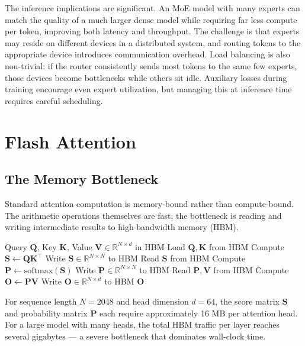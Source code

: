 \documentclass{book}
\begin{document}
The inference implications are significant. An MoE model with many experts
can match the quality of a much larger dense model while requiring far less
compute per token, improving both latency and throughput. The challenge is
that experts may reside on different devices in a distributed system, and
routing tokens to the appropriate device introduces communication overhead.
Load balancing is also non-trivial: if the router consistently sends most
tokens to the same few experts, those devices become bottlenecks while
others sit idle. Auxiliary losses during training encourage even expert
utilization, but managing this at inference time requires careful scheduling.

\section{Flash Attention}
\label{sec:flash_attention}

\subsection{The Memory Bottleneck}
\label{sec:attention_bottleneck}

Standard attention computation is memory-bound rather than compute-bound.
The arithmetic operations themselves are fast; the bottleneck is reading
and writing intermediate results to high-bandwidth memory (HBM).

\begin{algorithm}[H]
\caption{Standard Self-Attention (Memory Bound)}
\label{alg:standard_attention}
\begin{algorithmic}[1]
\Require Query $\mathbf{Q}$, Key $\mathbf{K}$, Value $\mathbf{V} \in
    \mathbb{R}^{N \times d}$ in HBM
\State Load $\mathbf{Q}, \mathbf{K}$ from HBM
\State Compute $\mathbf{S} \leftarrow \mathbf{Q}\mathbf{K}^\top$
\State Write $\mathbf{S} \in \mathbb{R}^{N \times N}$ to HBM
\State Read $\mathbf{S}$ from HBM
\State Compute $\mathbf{P} \leftarrow \text{softmax}(\mathbf{S})$
\State Write $\mathbf{P} \in \mathbb{R}^{N \times N}$ to HBM
\State Read $\mathbf{P}, \mathbf{V}$ from HBM
\State Compute $\mathbf{O} \leftarrow \mathbf{P}\mathbf{V}$
\State Write $\mathbf{O} \in \mathbb{R}^{N \times d}$ to HBM
\State \Return $\mathbf{O}$
\end{algorithmic}
\end{algorithm}

For sequence length $N = 2048$ and head dimension $d = 64$, the score
matrix $\mathbf{S}$ and probability matrix $\mathbf{P}$ each require
approximately 16 MB per attention head. For a large model with many heads,
the total HBM traffic per layer reaches several gigabytes --- a severe
bottleneck that dominates wall-clock time.
\end{document}
